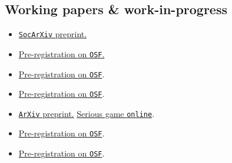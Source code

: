 \subsection{Working papers \& work-in-progress}
\begin{itemize}[leftmargin=2.75cm,itemsep=2pt]
\item { \href{https://www.doi.org/10.31235/osf.io/kr64j_v1}{\texttt{SocArXiv} preprint.}}
\item { \href{https://www.doi.org/10.17605/OSF.IO/JNS4H}{Pre-registration on \texttt{OSF}.}} 
\item { \href{https://osf.io/h2stv/?view_only=db9bcdb538bb4a028d96aec6c6821ab6}{Pre-registration on \texttt{OSF}}.}
\item { \href{https://osf.io/atcyr/?view_only=0b7495d1f3ca480fbc1a8dfef4a64911}{Pre-registration on \texttt{OSF}}.}
\item {
\href{https://doi.org/10.48550/arXiv.2508.12799}{\texttt{ArXiv} preprint.} \href{https://sweet-sure.ch/game/}{Serious game \texttt{online}}.}
\item { \href{https://osf.io/5atwq/?view_only=d5afa28f9a214b48af3ec1d514dbc7d4}{Pre-registration on \texttt{OSF}}.}
\item { \href{https://osf.io/5atwq/?view_only=d5afa28f9a214b48af3ec1d514dbc7d4}{Pre-registration on \texttt{OSF}}.}
\end{itemize}

